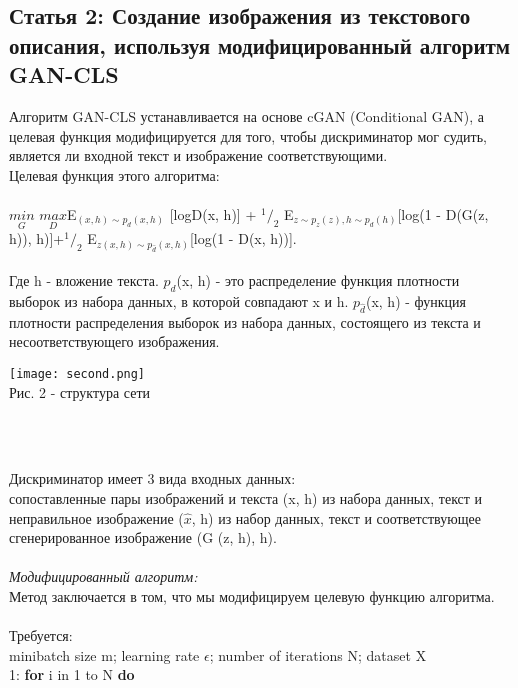 \documentclass{article}
\begin{document}
    \newpage
    \begin{center} 
    \section{Статья 2: Создание изображения из текстового описания, используя модифицированный алгоритм GAN-CLS}
    \end{center} 
    \large 
    Алгоритм GAN-CLS устанавливается на основе cGAN (Conditional GAN), а целевая функция модифицируется для того, чтобы дискриминатор мог судить, является ли входной текст и изображение соответствующими.\\
    Целевая функция этого алгоритма:\\ \\
    $\underset{G}{min}$ $\underset{D}{max}$E$_{(x,h) \sim p_{d}(x,h)}$ [logD(x, h)] + $^1/_2$ E$_{z \sim p_{z}(z),h \sim p_{d}(h)}$[log(1 - D(G(z, h)), h)]+$^1/_2$ E$_{z(x,h) \sim p_{\hat{d}}(x,h)}$[log(1 - D(x, h))].
    \\ \\
    Где h - вложение текста. $p_{d}$(x, h) - это распределение функция плотности выборок из набора данных, в которой совпадают x и h. $p_{\hat{d}}$(x, h) - функция плотности распределения выборок из набора данных, состоящего из текста и несоответствующего изображения.
    \\
    \begin{center} 
    \texttt{[image: second.png]}
    \\
    \caption{Рис. 2 - структура сети}
    \\ \\
    \end{center} 
    Дискриминатор имеет 3 вида входных данных:\\
    сопоставленные пары изображений и текста (x, h) из набора данных, текст и неправильное изображение ($\hat{x}$, h) из набор данных, текст и соответствующее сгенерированное изображение (G (z, h), h).
    \\ \\
    \textit{Модифицированный алгоритм:}\\
    Метод заключается в том, что мы модифицируем целевую функцию алгоритма.
    \\
    \\
    Требуется: \\
    minibatch size m; learning rate $\epsilon$; number of iterations N; dataset X \\
    1: \textbf {for} i in 1 to N \textbf {do}\\
\end{document}
